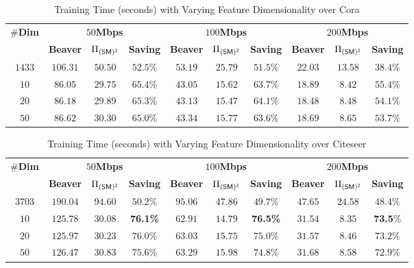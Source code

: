 \begin{table*}[!t]
 	\centering
 	\caption{Training Time (seconds) with Varying Feature Dimensionality over Cora}
 	\label{table:time_fea_dim_train_cora}
\setlength\tabcolsep{8pt}
 	 	\begin{tabular}{c|c|c|c|c|c|c|c|c|c}
 	 	\hline
 \multirow{2}{*}{\textbf{$\#$Dim}} &\multicolumn{3}{c|}{\textbf{$50$Mbps}} &\multicolumn{3}{c|}{\textbf{$100$Mbps}}&\multicolumn{3}{c}{\textbf{$200$Mbps}}
 \\\cline{2-10}
 	& \textbf{Beaver} & ${\Pi_{\mathsf{(SM)^2}}}$ & \textbf{Saving} & \textbf{Beaver} & ${\Pi_{\mathsf{(SM)^2}}}$ 	& \textbf{Saving} & \textbf{Beaver} & ${\Pi_{\mathsf{(SM)^2}}}$ & \textbf{Saving} \\
 	 	\hline
 	 	 $1433$&$106.31$&$50.50$&$52.5\%$&$53.19$&$25.79$&$51.5\%$&$22.03$& $13.58$& $38.4\%$\\
 	 $10$&$86.05$&$29.75$&$65.4\%$&$43.05$&$15.62$&$63.7\%$&$18.89$& $8.42$& $55.4\%$\\
 	 $20$&$86.18$&$29.89$&$65.3\%$&$43.13$&$15.47$&$64.1\%$&$18.48$& $8.48$& $54.1\%$\\
 	 $50$&$86.62$&$30.30$&$65.0\%$&$43.34$&$15.77$&$63.6\%$&$18.69$& $8.65$& $53.7\%$\\\hline
 	 \end{tabular}
\end{table*}

\begin{table*}[!t]
 	\centering
 	\caption{Training Time (seconds) with Varying Feature Dimensionality over Citeseer}
 	\label{table:time_fea_dim_train_cite}
 \setlength\tabcolsep{8pt}
 	 	\begin{tabular}{c|c|c|c|c|c|c|c|c|c}
 	 	\hline
 \multirow{2}{*}{\textbf{$\#$Dim}} &\multicolumn{3}{c|}{\textbf{$50$Mbps}} &\multicolumn{3}{c|}{\textbf{$100$Mbps}} &\multicolumn{3}{c}{\textbf{$200$Mbps}}
 \\\cline{2-10}
 	 & \textbf{Beaver} & ${\Pi_{\mathsf{(SM)^2}}}$ & \textbf{Saving} & \textbf{Beaver} & ${\Pi_{\mathsf{(SM)^2}}}$ 	 & \textbf{Saving} & \textbf{Beaver} & ${\Pi_{\mathsf{(SM)^2}}}$ & \textbf{Saving} \\
 	 	\hline
 	 	 $3703$ &$190.04$ &$94.60$ &$50.2\%$ &$95.06$ &$47.86$ &$49.7\%$ &$47.65$ & $24.58$ & $48.4\%$\\
 	 $10$ &$125.78$ &$30.08$ &\textbf{76.1\%} &$62.91$ &$14.79$ &\textbf{76.5\%} &$31.54$ & $8.35$ & \textbf{73.5}\%\\
 	 $20$ &$125.97$ &$30.23$ &$76.0\%$ &$63.03$ &$15.75$ &$75.0\%$ &$31.57$ & $8.46$ & $73.2\%$\\
 	 $50$ &$126.47$ &$30.83$ &$75.6\%$ &$63.29$ &$15.98$ &$74.8\%$ &$31.68$ & $8.58$ & $72.9\%$\\\hline
 	 \end{tabular}
\end{table*}


